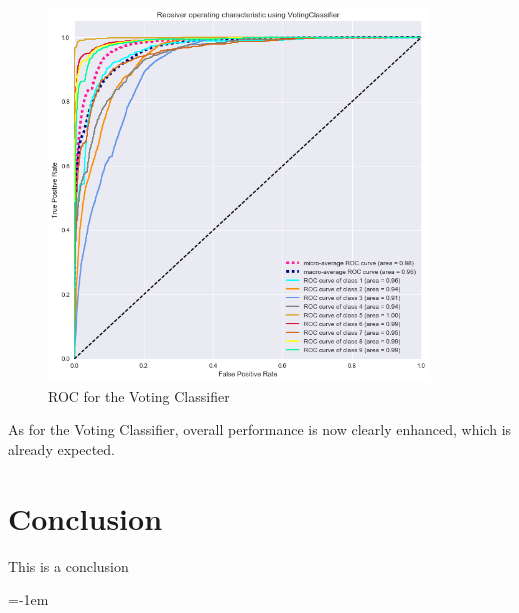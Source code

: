 \documentclass[a4paper,english,12pt]{article}
\makeatletter
\newcommand{\emptypage}[1]{
  \cleardoublepage
  \begingroup
  \let\ps@plain\ps@empty
  \pagestyle{empty}
  #1
  \cleardoublepage
  \endgroup}
\makeatother
\begin{document}
\begin{figure}[H]
	\centering
	\includegraphics[width=0.9\textwidth,keepaspectratio]{ROC_OvR_Voting}
	\caption{ROC for the Voting Classifier}
\end{figure}

As for the Voting Classifier, overall performance is now clearly enhanced, which is already expected. 

\section{Conclusion}
This is a conclusion


\parskip=-1em
\let\section\oldsection %
%
\end{document}
